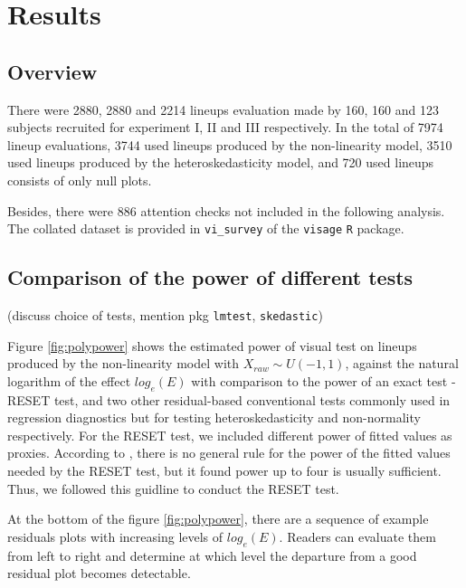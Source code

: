 \documentclass[]{interact}
\theoremstyle{plain}%
\theoremstyle{definition}
\theoremstyle{remark}
\begin{document}
\hypertarget{results}{%
\section{Results}\label{results}}

\hypertarget{overview}{%
\subsection{Overview}\label{overview}}

There were 2880, 2880 and 2214 lineups evaluation made by 160, 160 and
123 subjects recruited for experiment I, II and III respectively. In the
total of 7974 lineup evaluations, 3744 used lineups produced by the
non-linearity model, 3510 used lineups produced by the
heteroskedasticity model, and 720 used lineups consists of only null
plots.

Besides, there were 886 attention checks not included in the following
analysis. The collated dataset is provided in \texttt{vi\_survey} of the
\texttt{visage} \texttt{R} package.

\hypertarget{comparison-of-the-power-of-different-tests}{%
\subsection{Comparison of the power of different
tests}\label{comparison-of-the-power-of-different-tests}}

(discuss choice of tests, mention pkg \texttt{lmtest},
\texttt{skedastic})

Figure \ref{fig:polypower} shows the estimated power of visual test on
lineups produced by the non-linearity model with
\(X_{raw} \sim U(-1,1)\), against the natural logarithm of the effect
\(log_e(E)\) with comparison to the power of an exact test - RESET test,
and two other residual-based conventional tests commonly used in
regression diagnostics but for testing heteroskedasticity and
non-normality respectively. For the RESET test, we included different
power of fitted values as proxies. According to
\citep{ramsey_tests_1969}, there is no general rule for the power of the
fitted values needed by the RESET test, but it found power up to four is
usually sufficient. Thus, we followed this guidline to conduct the RESET
test.

At the bottom of the figure \ref{fig:polypower}, there are a sequence of
example residuals plots with increasing levels of \(log_e(E)\). Readers
can evaluate them from left to right and determine at which level the
departure from a good residual plot becomes detectable.
\end{document}
